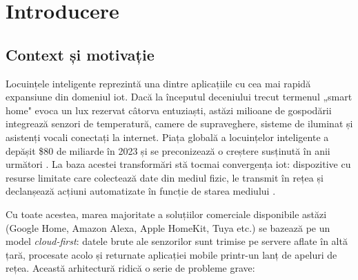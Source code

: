 \chapter{Introducere}
\label{ch:introducere}

\section{Context și motivație}
\label{sec:motivatie}

Locuințele inteligente reprezintă una dintre aplicațiile cu cea mai rapidă
expansiune din domeniul \gls{iot}. Dacă la începutul deceniului trecut
termenul „smart home" evoca un lux rezervat câtorva entuziaști, astăzi
milioane de gospodării integrează senzori de temperatură, camere de
supraveghere, sisteme de iluminat și asistenți vocali conectați la internet.
Piața globală a locuințelor inteligente a depășit \$80 de miliarde în 2023
și se preconizează o creștere susținută în anii următori
\cite{stojkoska2017smarthome,gubbi2013iot}. La baza acestei transformări stă
tocmai convergența \gls{iot}: dispozitive cu resurse limitate care colectează
date din mediul fizic, le transmit în rețea și declanșează acțiuni automatizate
în funcție de starea mediului \cite{atzori2010iot}.

Cu toate acestea, marea majoritate a soluțiilor comerciale disponibile astăzi
(Google Home, Amazon Alexa, Apple HomeKit, Tuya etc.) se bazează pe un model
\emph{cloud-first}: datele brute ale senzorilor sunt trimise pe servere aflate
în altă țară, procesate acolo și returnate aplicației mobile printr-un lanț
de apeluri de rețea. Această arhitectură ridică o serie de probleme grave:

